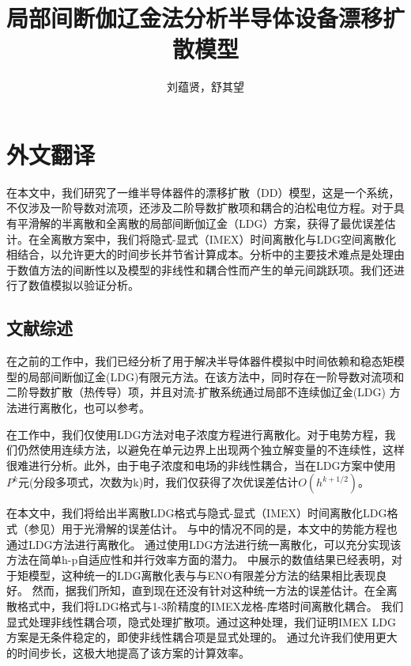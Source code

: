 \cleardoublepage

\newrefsection
\sectionmajornumbering

\chapter{外文翻译}
\title{局部间断伽辽金法分析半导体设备漂移扩散模型}
\author{刘蕴贤，舒其望}
\date{}
\maketitle
{}
在本文中，我们研究了一维半导体器件的漂移扩散（DD）模型，这是一个系统，不仅涉及一阶导数对流项，还涉及二阶导数扩散项和耦合的泊松电位方程。对于具有平滑解的半离散和全离散的局部间断伽辽金（LDG）方案，获得了最优误差估计。在全离散方案中，我们将隐式-显式（IMEX）时间离散化与LDG空间离散化相结合，以允许更大的时间步长并节省计算成本。分析中的主要技术难点是处理由于数值方法的间断性以及模型的非线性和耦合性而产生的单元间跳跃项。我们还进行了数值模拟以验证分析。

\section{文献综述}
在之前的工作\parencite{liu2010error}中，我们已经分析了用于解决半导体器件模拟中时间依赖和稳态矩模型的局部间断伽辽金(LDG)有限元方法。在该方法中，同时存在一阶导数对流项和二阶导数扩散（热传导）项，并且对流-扩散系统通过局部不连续伽辽金(LDG) 方法进行离散化\parencite{cockburn1998local,cockburn2001runge}，也可以参考\parencite{bank1983numerical,bank1998finite,chainais2003finite,bessemoulin2012finite}。

在工作\parencite{liu2010error}中，我们仅使用LDG方法对电子浓度方程进行离散化。对于电势方程，我们仍然使用连续方法，以避免在单元边界上出现两个独立解变量的不连续性，这样很难进行分析。此外，由于电子浓度和电场的非线性耦合，当在LDG方案中使用$P^k$元(分段多项式，次数为k)时，我们仅获得了次优误差估计$O(h^{k+1/2})$。

在本文中，我们将给出半离散LDG格式与隐式-显式（IMEX）时间离散化LDG格式（参见\parencite{wang2015stability,wang2015stabilityd}）用于光滑解的误差估计。
与\parencite{liu2010error}中的情况不同的是，本文中的势能方程也通过LDG方法进行离散化。
通过使用LDG方法进行统一离散化，可以充分实现该方法在简单h-p自适应性和并行效率方面的潜力。
\parencite{liu2004local,liu2007locala}中展示的数值结果已经表明，对于矩模型，这种统一的LDG离散化表与与ENO有限差分方法\parencite{jerome1994energy}的结果相比表现良好。
然而，据我们所知，直到现在还没有针对这种统一方法的误差估计。在全离散格式中，我们将LDG格式与1-3阶精度的IMEX龙格-库塔时间离散化耦合。
我们显式处理非线性耦合项，隐式处理扩散项。通过这种处理，我们证明IMEX LDG方案是无条件稳定的，即使非线性耦合项是显式处理的。
通过允许我们使用更大的时间步长，这极大地提高了该方案的计算效率。

